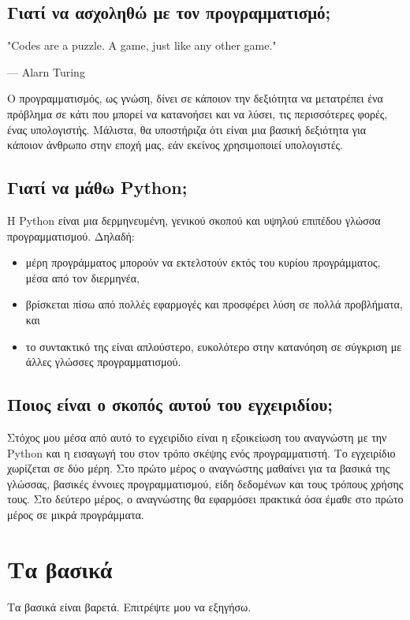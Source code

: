 \documentclass[a4paper,14pt]{extreport}
\begin{document}
\section{Γιατί να ασχοληθώ με τον προγραμματισμό;}

\epigraph{"Codes are a puzzle. A game, just like any other game."}{— Alarn Turing}
Ο προγραμματισμός, ως γνώση, δίνει σε κάποιον την δεξιότητα να
μετατρέπει ένα πρόβλημα σε κάτι που μπορεί να κατανοήσει και να λύσει,
τις περισσότερες φορές, ένας υπολογιστής. Μάλιστα, θα υποστήριζα ότι
είναι μια βασική δεξιότητα για κάποιον άνθρωπο στην εποχή μας,
εάν εκείνος χρησιμοποιεί υπολογιστές.

\section{Γιατί να μάθω Python;}

Η Python είναι μια δερμηνευμένη, γενικού σκοπού και υψηλού επιπέδου γλώσσα
προγραμματισμού. Δηλαδή:
\begin{itemize}
    \item μέρη προγράμματος μπορούν να εκτελστούν εκτός του κυρίου
          προγράμματος, μέσα από τον διερμηνέα,
    \item βρίσκεται πίσω από πολλές εφαρμογές και προσφέρει λύση σε πολλά
          προβλήματα, και
    \item το συντακτικό της είναι απλούστερο, ευκολότερο στην κατανόηση σε
          σύγκριση με άλλες γλώσσες προγραμματισμού.
\end{itemize}

\section{Ποιος είναι ο σκοπός αυτού του εγχειριδίου;}

Στόχος μου μέσα από αυτό το εγχειρίδιο είναι η εξοικείωση του αναγνώστη
με την Python και η εισαγωγή του στον τρόπο σκέψης ενός προγραμματιστή.
Το εγχειρίδιο χωρίζεται σε δύο μέρη. Στο πρώτο μέρος ο αναγνώστης μαθαίνει
για τα βασικά της γλώσσας, βασικές έννοιες προγραμματισμού, είδη δεδομένων
και τους τρόπους χρήσης τους. Στο δεύτερο μέρος, ο αναγνώστης θα εφαρμόσει
πρακτικά όσα έμαθε στο πρώτο μέρος σε μικρά προγράμματα.

\chapter{Τα βασικά}

Τα βασικά είναι βαρετά. Επιτρέψτε μου να εξηγήσω.
\end{document}
